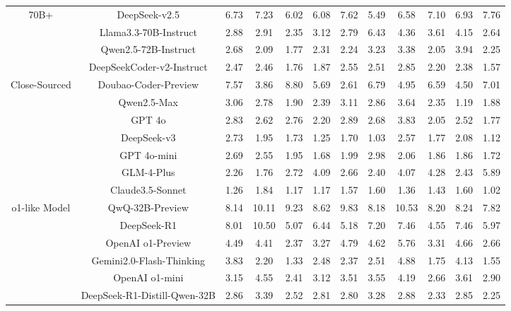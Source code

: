 \documentclass[11pt, a4paper, logo, copyright, nonumbering, amsart]{map}
\begin{document}
\begin{CJK*}{UTF8}{gbsn}
\begin{table*}[h!]
\begin{adjustbox}{width=\textwidth}
\begin{tabular}{c|c|cccccccccc}
    \midrule
    \multirow{4}{*}{70B+} 
    & DeepSeek-v2.5 & 6.73 & 7.23 & 6.02 & 6.08 & 7.62 & 5.49 & 6.58 & 7.10 & 6.93 & 7.76 \\
    & Llama3.3-70B-Instruct & 2.88 & 2.91 & 2.35 & 3.12 & 2.79 & 6.43 & 4.36 & 3.61 & 4.15 & 2.64 \\
    & Qwen2.5-72B-Instruct & 2.68 & 2.09 & 1.77 & 2.31 & 2.24 & 3.23 & 3.38 & 2.05 & 3.94 & 2.25 \\
    & DeepSeekCoder-v2-Instruct & 2.47 & 2.46 & 1.76 & 1.87 & 2.55 & 2.51 & 2.85 & 2.20 & 2.38 & 1.57 \\
    
    \midrule
    \multirow{7}{*}{Close-Sourced} 
    & Doubao-Coder-Preview & 7.57 & 3.86 & 8.80 & 5.69 & 2.61 & 6.79 & 4.95 & 6.59 & 4.50 & 7.01 \\
    & Qwen2.5-Max & 3.06 & 2.78 & 1.90 & 2.39 & 3.11 & 2.86 & 3.64 & 2.35 & 1.19 & 1.88 \\
    & GPT 4o & 2.83 & 2.62 & 2.76 & 2.20 & 2.89 & 2.68 & 3.83 & 2.05 & 2.52 & 1.77 \\
    & DeepSeek-v3 & 2.73 & 1.95 & 1.73 & 1.25 & 1.70 & 1.03 & 2.57 & 1.77 & 2.08 & 1.12 \\
    & GPT 4o-mini & 2.69 & 2.55 & 1.95 & 1.68 & 1.99 & 2.98 & 2.06 & 1.86 & 1.86 & 1.72 \\
    & GLM-4-Plus & 2.26 & 1.76 & 2.72 & 4.09 & 2.66 & 2.40 & 4.07 & 4.28 & 2.43 & 5.89 \\
    & Claude3.5-Sonnet & 1.26 & 1.84 & 1.17 & 1.17 & 1.57 & 1.60 & 1.36 & 1.43 & 1.60 & 1.02 \\
    
    \midrule
    \multirow{6}{*}{o1-like Model} 
    & QwQ-32B-Preview & 8.14 & 10.11 & 9.23 & 8.62 & 9.83 & 8.18 & 10.53 & 8.20 & 8.24 & 7.82 \\
    & DeepSeek-R1 & 8.01 & 10.50 & 5.07 & 6.44 & 5.18 & 7.20 & 7.46 & 4.55 & 7.46 & 5.97 \\
    & OpenAI o1-Preview & 4.49 & 4.41 & 2.37 & 3.27 & 4.79 & 4.62 & 5.76 & 3.31 & 4.66 & 2.66 \\
    & Gemini2.0-Flash-Thinking & 3.83 & 2.20 & 1.33 & 2.48 & 2.37 & 2.51 & 4.88 & 1.75 & 4.13 & 1.55 \\
    & OpenAI o1-mini & 3.15 & 4.55 & 2.41 & 3.12 & 3.51 & 3.55 & 4.19 & 2.66 & 3.61 & 2.90 \\
    & DeepSeek-R1-Distill-Qwen-32B & 2.86 & 3.39 & 2.52 & 2.81 & 2.80 & 3.28 & 2.88 & 2.33 & 2.85 & 2.25 \\
    \bottomrule
    \end{tabular}
    \end{adjustbox}
\end{table*}


\end{CJK*}
\end{document}
